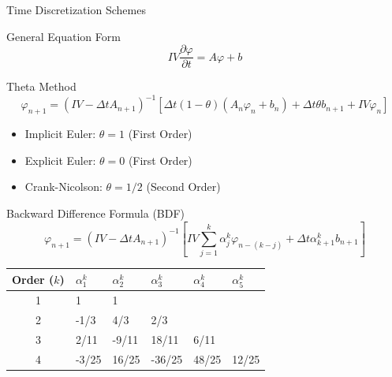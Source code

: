 \documentclass[8pt,xcolor=dvipnames]{beamer}
\newcommand{\be}{\begin{equation*}}
\newcommand{\ee}{\end{equation*}}
\begin{document}
\begin{frame}{Time Discretization Schemes}
\vspace{-3mm}

\begin{block}{General Equation Form}
\be 
IV\frac{\partial \varphi}{\partial t} = A\varphi+b
\ee
\end{block}
\vspace{-3mm}

\begin{block}{Theta Method}
\be
\varphi_{n+1} = (IV-\Delta t A_{n+1})^{-1}\left[\Delta t(1-\theta)(A_n\varphi_n+b_n) + \Delta t\theta b_{n+1} + IV\varphi_n\right]
\ee
\begin{itemize}
\item Implicit Euler: $\theta=1$ (First Order)
\item Explicit Euler: $\theta=0$ (First Order)
\item Crank-Nicolson: $\theta=1/2$ (Second Order)
\end{itemize}
\end{block}
\vspace{-3mm}

\begin{block}{Backward Difference Formula (BDF)}
\be 
\varphi_{n+1} = (IV-\Delta t A_{n+1})^{-1}\left[IV\sum_{j=1}^{k}\alpha_{j}^{k}\varphi_{n-(k-j)} + \Delta t \alpha_{k+1}^{k} b_{n+1}\right]
\ee
\centering
\begin{tabular}{c|lllll}
\hline
Order ($k$) & $\alpha_{1}^{k}$ & $\alpha_{2}^{k}$ & $\alpha_{3}^{k}$ & $\alpha_{4}^{k}$ & $\alpha_{5}^{k}$ \\
\hline
1 & 1 & 1 & & & \\
2 & -1/3 & 4/3 & 2/3 & & \\
3 & 2/11 & -9/11 & 18/11 & 6/11 & \\
4 & -3/25 & 16/25 & -36/25 & 48/25 & 12/25 \\
\hline
\end{tabular}
\end{block}

\end{frame}
\end{document}
